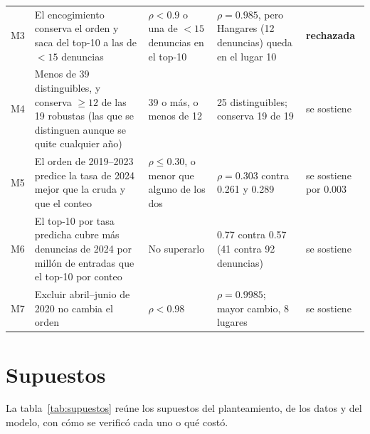 \documentclass[conference]{IEEEtran}
\newcommand{\pme}{por millón de entradas}
\begin{document}
\begin{table}[t]
\begin{tabular}{@{}l L{4.8cm} L{4.0cm} L{4.3cm} L{1.7cm}@{}}
M3 & El encogimiento conserva el orden y saca del top-10 a las de $< 15$ denuncias & $\rho < 0.9$ o una de $< 15$ denuncias en el top-10 & $\rho = 0.985$, pero Hangares (12 denuncias) queda en el lugar 10 & \textbf{rechazada} \\
M4 & Menos de 39 distinguibles, y conserva $\geq 12$ de las 19 robustas (las que se distinguen aunque se quite cualquier año) & 39 o más, o menos de 12 & 25 distinguibles; conserva 19 de 19 & se sostiene \\
M5 & El orden de 2019--2023 predice la tasa de 2024 mejor que la cruda y que el conteo & $\rho \leq 0.30$, o menor que alguno de los dos & $\rho = 0.303$ contra 0.261 y 0.289 & se sostiene por 0.003 \\
M6 & El top-10 por tasa predicha cubre más denuncias de 2024 \pme{} que el top-10 por conteo & No superarlo & 0.77 contra 0.57 (41 contra 92 denuncias) & se sostiene \\
M7 & Excluir abril--junio de 2020 no cambia el orden & $\rho < 0.98$ & $\rho = 0.9985$; mayor cambio, 8 lugares & se sostiene \\
\bottomrule
\end{tabular}
\end{table}

\section{Supuestos}

La tabla~\ref{tab:supuestos} reúne los supuestos del planteamiento, de los datos y del modelo, con cómo se verificó cada uno o qué costó.
\end{document}
